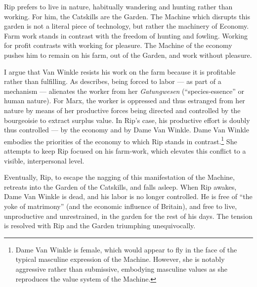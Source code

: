 \documentclass[man,12pt,natbib]{apa6}
\begin{document}
Rip prefers to live in nature, habitually wandering and hunting rather than
working. For him, the Catskills are the Garden. The Machine which disrupts this
garden is not a literal piece of technology, but rather the machinery of
Economy. Farm work stands in contrast with the freedom of hunting and fowling.
Working for profit contrasts with working for pleasure. The Machine of the
economy pushes him to remain on his farm, out of the Garden, and work without
pleasure.

I argue that Van Winkle resists his work on the farm because it is profitable
rather than fulfilling.  As \citet{Marx44} describes, being forced to labor ---
as part of a mechanism --- alienates the worker from her \emph{Gatungwesen}
(``species-essence'' or human nature).  For Marx, the worker is oppressed and
thus estranged from her nature by means of her productive forces being directed
and controlled by the bourgeoisie to extract surplus value. In Rip's case, his
productive effort is doubly thus controlled --- by the economy and by Dame Van
Winkle.  Dame Van Winkle embodies the priorities of the economy to which Rip
stands in contrast.\footnote{Dame Van Winkle is female, which would appear to
fly in the face of the typical masculine expression of the Machine.  However,
she is notably aggressive rather than submissive, embodying masculine values as
she reproduces the value system of the Machine.} She attempts to keep Rip
focused on his farm-work, which elevates this conflict to a visible,
interpersonal level.

Eventually, Rip, to escape the nagging of this manifestation of the Machine,
retreats into the Garden of the Catskills, and falls asleep. When Rip awakes,
Dame Van Winkle is dead, and his labor is no longer controlled. He is free of
``the yoke of matrimony'' (and the economic influence of Britain), and free to
live, unproductive and unrestrained, in the garden for the rest of his days.
The tension is resolved with Rip and the Garden triumphing unequivocally.



\end{document}
